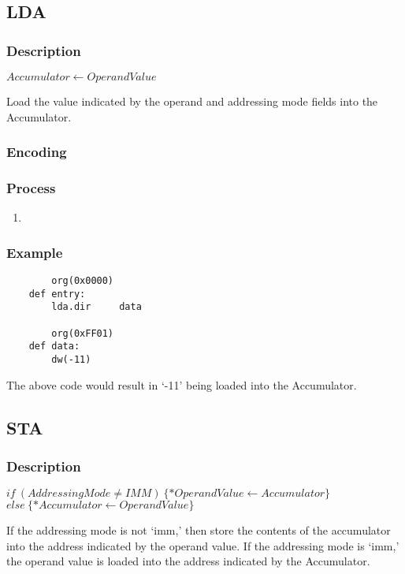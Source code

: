 \subsection{LDA}\label{subsec:lda}
    \subsubsection{Description}
    $Accumulator \leftarrow Operand Value$
    \par Load the value indicated by the operand and addressing mode fields into the Accumulator.

    \subsubsection{Encoding}

    \subsubsection{Process}
    \begin{enumerate}
        \item
    \end{enumerate}

    \subsubsection{Example}
    \begin{verbatim}
        org(0x0000)
    def entry:
        lda.dir     data

        org(0xFF01)
    def data:
        dw(-11)
    \end{verbatim}
    \par The above code would result in `-11' being loaded into the Accumulator.


\subsection{STA}\label{subsec:sta}
    \subsubsection{Description}
    $if\ (AddressingMode \neq IMM)\ \{ *OperandValue \leftarrow Accumulator \}$ \\
    $else\ \{ *Accumulator \leftarrow OperandValue \}$
    \par If the addressing mode is not `imm,' then store the contents of the accumulator into the address indicated by
    the operand value.
    If the addressing mode is `imm,' the operand value is loaded into the address indicated by the Accumulator.

